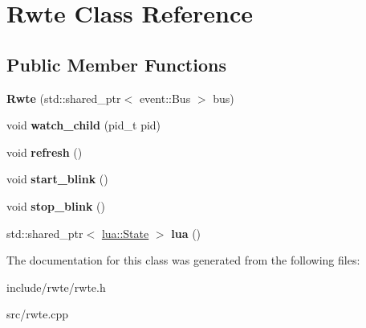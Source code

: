 \hypertarget{classRwte}{}\section{Rwte Class Reference}
\label{classRwte}
\subsection*{Public Member Functions}
\begin{DoxyCompactItemize}
\item 
\mbox{\label{classRwte_a9501267963158085b18cfae26837408d}} 
{\bfseries Rwte} (std\+::shared\+\_\+ptr$<$ event\+::\+Bus $>$ bus)
\item 
\mbox{\label{classRwte_a132f97be3fd05c8f7ce68f314000163d}} 
void {\bfseries watch\+\_\+child} (pid\+\_\+t pid)
\item 
\mbox{\label{classRwte_a05bff547640de67f27de3b776c084916}} 
void {\bfseries refresh} ()
\item 
\mbox{\label{classRwte_a4cab27044b80bb124dab5ae6ad267d88}} 
void {\bfseries start\+\_\+blink} ()
\item 
\mbox{\label{classRwte_a97871c10b31df180374883000a7691fa}} 
void {\bfseries stop\+\_\+blink} ()
\item 
\mbox{\label{classRwte_a1b56b07eac8b97dcf9c645bca667c78c}} 
std\+::shared\+\_\+ptr$<$ \mbox{\hyperlink{classlua_1_1State}{lua\+::\+State}} $>$ {\bfseries lua} ()
\end{DoxyCompactItemize}


The documentation for this class was generated from the following files\+:\begin{DoxyCompactItemize}
\item 
include/rwte/rwte.\+h\item 
src/rwte.\+cpp\end{DoxyCompactItemize}
